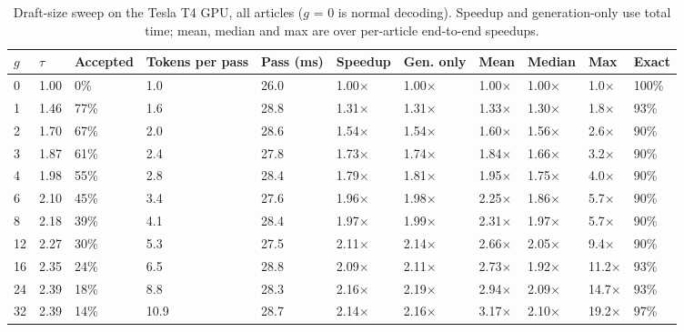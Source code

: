 \documentclass[11pt,a4paper]{article}
\begin{document}
\begin{table}[H]
\centering
\small
\caption{Draft-size sweep on the Tesla T4 GPU, all articles ($g$ = 0 is normal decoding). Speedup and generation-only use total time; mean, median and max are over per-article end-to-end speedups.}
\setlength{\tabcolsep}{4pt}
\begin{tabular}{L{0.81cm}L{0.90cm}L{1.54cm}L{1.36cm}L{1.17cm}L{1.45cm}L{1.26cm}L{1.08cm}L{1.26cm}L{1.08cm}L{1.08cm}}
\toprule
\textbf{$g$} & \textbf{$\tau$} & \textbf{Accepted} & \textbf{Tokens per pass} & \textbf{Pass (ms)} & \textbf{Speedup} & \textbf{Gen. only} & \textbf{Mean} & \textbf{Median} & \textbf{Max} & \textbf{Exact} \\
 & 1.00 & 0\% & 1.0 & 26.0 & 1.00$\times$ & 1.00$\times$ & 1.00$\times$ & 1.00$\times$ & 1.0$\times$ & 100\% \\
1 & 1.46 & 77\% & 1.6 & 28.8 & 1.31$\times$ & 1.31$\times$ & 1.33$\times$ & 1.30$\times$ & 1.8$\times$ & 93\% \\
2 & 1.70 & 67\% & 2.0 & 28.6 & 1.54$\times$ & 1.54$\times$ & 1.60$\times$ & 1.56$\times$ & 2.6$\times$ & 90\% \\
3 & 1.87 & 61\% & 2.4 & 27.8 & 1.73$\times$ & 1.74$\times$ & 1.84$\times$ & 1.66$\times$ & 3.2$\times$ & 90\% \\
4 & 1.98 & 55\% & 2.8 & 28.4 & 1.79$\times$ & 1.81$\times$ & 1.95$\times$ & 1.75$\times$ & 4.0$\times$ & 90\% \\
6 & 2.10 & 45\% & 3.4 & 27.6 & 1.96$\times$ & 1.98$\times$ & 2.25$\times$ & 1.86$\times$ & 5.7$\times$ & 90\% \\
8 & 2.18 & 39\% & 4.1 & 28.4 & 1.97$\times$ & 1.99$\times$ & 2.31$\times$ & 1.97$\times$ & 5.7$\times$ & 90\% \\
12 & 2.27 & 30\% & 5.3 & 27.5 & 2.11$\times$ & 2.14$\times$ & 2.66$\times$ & 2.05$\times$ & 9.4$\times$ & 90\% \\
16 & 2.35 & 24\% & 6.5 & 28.8 & 2.09$\times$ & 2.11$\times$ & 2.73$\times$ & 1.92$\times$ & 11.2$\times$ & 93\% \\
24 & 2.39 & 18\% & 8.8 & 28.3 & 2.16$\times$ & 2.19$\times$ & 2.94$\times$ & 2.09$\times$ & 14.7$\times$ & 93\% \\
32 & 2.39 & 14\% & 10.9 & 28.7 & 2.14$\times$ & 2.16$\times$ & 3.17$\times$ & 2.10$\times$ & 19.2$\times$ & 97\% \\
\bottomrule
\end{tabular}
\end{table}
\end{document}
